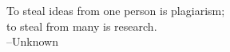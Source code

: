 \documentclass[11pt]{psuthesis2side}
\begin{document}
\begin{frontmatter}
\vspace*{2.0truein}

%
\parbox{4.0truein}{
\par\noindent
To steal ideas from one person is plagiarism;\\ to steal from many is research.\\
\hspace*{\fill}--Unknown
}
\end{frontmatter}







%
%
%
%
%
%


%
%
%
%

\appendices



%

%
\end{document}
